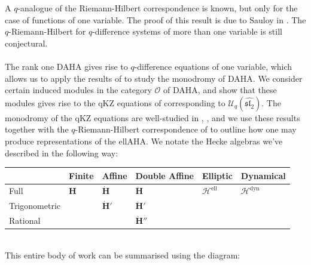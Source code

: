 \documentclass[a4paper]{report}
\theoremstyle{theorem}
\theoremstyle{definition}
\theoremstyle{remark}
\theoremstyle{proposition}
\theoremstyle{conjecture}
\theoremstyle{lemma}
\theoremstyle{corollary}
\theoremstyle{exercise}
\theoremstyle{example}
\newcommand{\mcal}{\mathcal}
\newcommand{\on}{\operatorname}
\newcommand{\dyn}{{\on{dyn}}}
\begin{document}
  A $q$-analogue of the Riemann-Hilbert correspondence is known, but only for the case of functions of one 
  variable. The proof of this result is due to Sauloy in \cite{sauloy03}. The $q$-Riemann-Hilbert for $q$-difference systems
  of more than one variable is still conjectural.\\\\
  The rank one DAHA gives rise to $q$-difference equations of one variable, which allows us to apply the results of 
  \cite{sauloy03} to study the monodromy of DAHA. We consider certain induced modules in the category $\mcal{O}$ of DAHA,
  and show that these modules gives rise to the qKZ equations of \cite{fr92} corresponding to $\mcal{U}_q(\widehat{\mathfrak{sl}_2})$.
  The monodromy of the qKZ equations are 
  well-studied in \cite{fr92}, \cite{efk98}, and we use these results together with the $q$-Riemann-Hilbert correspondence 
  of \cite{sauloy03} to outline how one may produce representations of the ellAHA.
  We notate the Hecke algebras we've described in the following way:\\
  \begin{table}[!ht]
      \centering
      \begin{tabular}{|l|l|l|l|l|l|}
      \hline
          ~ & Finite & Affine & Double Affine & Elliptic & Dynamical \\ \hline
          Full & $\mathbf{H}$ & $\mathbf{\dot{H}}$ & $\mathbf{\ddot{\mathbf{H}}}$ & $\mcal{H}^{\on{ell}}$ & $\mcal{H}^\dyn$ \\ \hline
          Trigonometric & ~ & $\mathbf{\dot{H}}'$ & $\mathbf{\ddot{\mathbf{H}}}'$ & ~ & ~ \\ \hline
          Rational & ~ & ~ & $\mathbf{\ddot{\mathbf{H}}}''$ & ~ & ~ \\ \hline
      \end{tabular}
  \end{table}\\
  This entire body of work can be summarised using the diagram:
\end{document}

